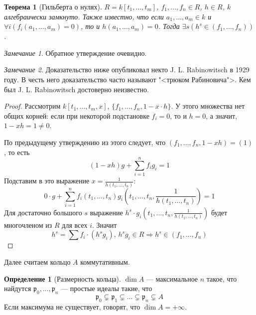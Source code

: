 \documentclass{article}
\newtheorem*{theorem}{Теорема}
\theoremstyle{definition}
\newtheorem*{definition}{Определение}
\theoremstyle{remark}
\newtheorem*{remark}{Замечание}
\newcommand{\Ra}{\Rightarrow}
\newcommand{\p}{\mathfrak{p}}
\begin{document}
\begin{theorem}[Гильберта о нулях]
    $R = k[t_1, \hdots, t_m]$, $f_1, \hdots, f_n \in R$, $h \in R$, $k$ алгебраически замкнуто. Также известно, что если $a_1, \hdots, a_m \in k$ и $\forall i (f_i(a_1, \hdots, a_m) = 0)$, то и $h(a_1, \hdots, a_m) = 0$. Тогда $\exists s \left( h^s \in (f_1, \hdots, f_n) \right)$.
\end{theorem}
\begin{remark}
    Обратное утверждение очевидно.
\end{remark}
\begin{remark}
    Доказательство ниже опубликовал некто J. L. Rabinowitsch в 1929 году. В честь него доказательство часто называют "<трюком Рабиновича">. Кем был J. L. Rabinowitsch достоверно неизвестно.
\end{remark}
\begin{proof}
    Рассмотрим $k[t_1,\hdots, t_m, x]$, $\{ f_1, \hdots, f_n, 1 - x \cdot h \}$. У этого множества нет общих корней: если при некоторой подстановке $f_i = 0$, то и $h = 0$, а значит, $1 - x h = 1 \neq 0$.

    По предыдущему утверждению из этого следует, что $(f_1, \hdots, f_n, 1 - xh) = (1)$, то есть
    \begin{equation*}
        (1 - xh) g + \sum_{i = 1}^{n} f_i g_i = 1
    \end{equation*}
    Подставим в это выражение $x = \frac{1}{h(t_1, \hdots, t_n)}$:
    \begin{equation*}
        0 \cdot g + \sum_{i = 1}^{n} f_i(t_1, \hdots, t_n) g_i\left(t_1, \hdots, t_n, \frac{1}{h(t_1, \hdots, t_n)}\right) = 1
    \end{equation*}
    Для достаточно большого $s$ выражение $h^s \cdot g_i(t_1, \hdots, t_n, \frac{1}{h(t_1, \hdots, t_n)})$ будет многочленом из $R$ для всех $i$. Значит
    \begin{equation*}
        h^s = \sum f_i \cdot (h^s g_i),\, h^s g_i \in R \Ra h^s \in (f_1, \hdots, f_n)
    \end{equation*}
\end{proof}

Далее считаем кольцо $A$ коммутативным.

\begin{definition}[Размерность кольца]
    $\dim A$ --- максимальное $n$ такое, что найдутся $\p_0, \hdots, \p_n$ --- простые идеалы такие, что
    \begin{equation*}
        \p_0 \subsetneq \p_1 \subsetneq \hdots \subsetneq \p_n \subsetneq A
    \end{equation*}
    Если максимума не существует, говорят,  что $\dim A = +\infty$.
\end{definition}
\end{document}
